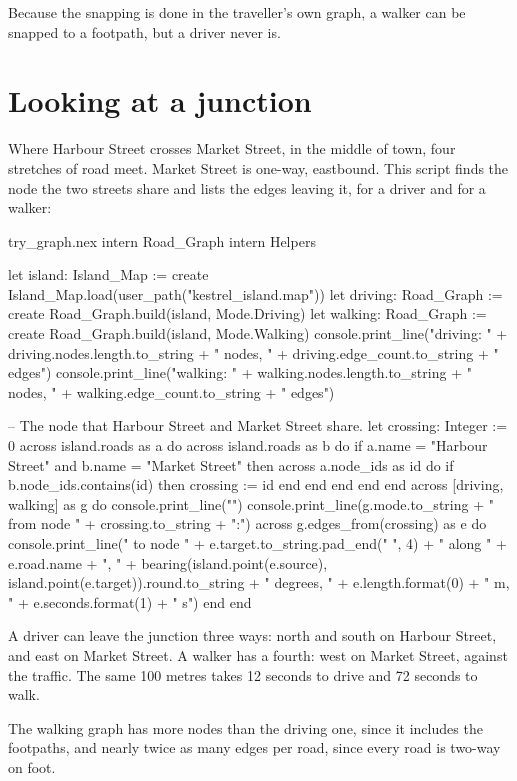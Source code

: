 Because the snapping is done in the traveller's own graph, a walker can be
snapped to a footpath, but a driver never is.

\section{Looking at a junction}

Where Harbour Street crosses Market Street, in the middle of town, four
stretches of road meet. Market Street is one-way, eastbound. This script
finds the node the two streets share and lists the edges leaving it, for a
driver and for a walker:

\begin{tryit}{try_graph.nex}
intern Road_Graph
intern Helpers

let island: Island_Map := create Island_Map.load(user_path("kestrel_island.map"))
let driving: Road_Graph := create Road_Graph.build(island, Mode.Driving)
let walking: Road_Graph := create Road_Graph.build(island, Mode.Walking)
console.print_line("driving: " + driving.nodes.length.to_string + " nodes, "
  + driving.edge_count.to_string + " edges")
console.print_line("walking: " + walking.nodes.length.to_string + " nodes, "
  + walking.edge_count.to_string + " edges")

-- The node that Harbour Street and Market Street share.
let crossing: Integer := 0
across island.roads as a do
  across island.roads as b do
    if a.name = "Harbour Street" and b.name = "Market Street" then
      across a.node_ids as id do
        if b.node_ids.contains(id) then
          crossing := id
        end
      end
    end
  end
end
across [driving, walking] as g do
  console.print_line("")
  console.print_line(g.mode.to_string + " from node " + crossing.to_string + ":")
  across g.edges_from(crossing) as e do
    console.print_line("  to node " + e.target.to_string.pad_end(" ", 4) + " along " + e.road.name
      + ", " + bearing(island.point(e.source), island.point(e.target)).round.to_string
      + " degrees, " + e.length.format(0) + " m, " + e.seconds.format(1) + " s")
  end
end
\end{tryit}

A driver can leave the junction three ways: north and south on Harbour
Street, and east on Market Street. A walker has a fourth: west on Market
Street, against the traffic. The same 100 metres takes 12 seconds to
drive and 72 seconds to walk.

The walking graph has more nodes than the driving one, since it includes
the footpaths, and nearly twice as many edges per road, since every road
is two-way on foot.
